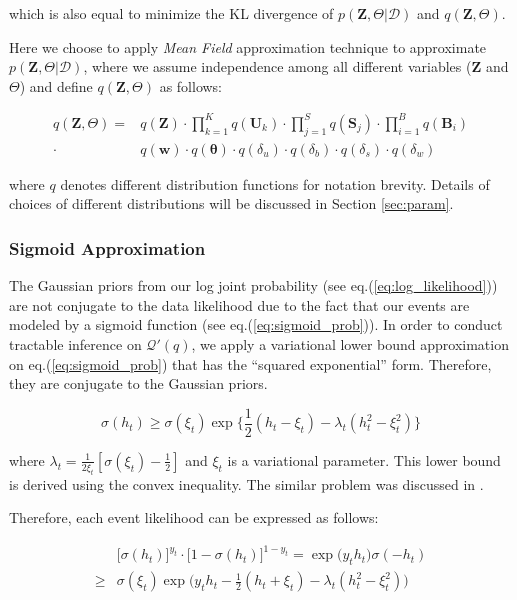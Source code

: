 \noindent which is also equal to minimize the KL divergence of $p(\bm{Z}, \Theta| \mathcal{D})$ and $q(\bm{Z}, \Theta)$.

Here we choose to apply \emph{Mean Field} approximation technique to approximate $p(\bm{Z}, \Theta| \mathcal{D})$, where we assume independence among all different variables ($\mathbf{Z}$ and $\Theta$) and define $q(\bm{Z}, \Theta)$ as follows:

\begin{align}
\label{eq:mean_field}
q(\bm{Z}, \Theta) = & q(\mathbf{Z}) \cdot \prod_{k=1}^K q(\mathbf{U}_k) \cdot \prod_{j=1}^S q(\mathbf{S}_j) \cdot \prod_{i=1}^B q(\mathbf{B}_i) \nonumber \\
\cdot & q(\mathbf{w}) \cdot q(\boldsymbol{\theta}) \cdot q(\delta_u) \cdot q(\delta_b) \cdot q(\delta_s) \cdot q(\delta_w)
\end{align}

\noindent where $q$ denotes different distribution functions for notation brevity. Details of choices of different distributions will be discussed in Section \ref{sec:param}.

\subsubsection{Sigmoid Approximation}

The Gaussian priors from our log joint probability (see eq.(\ref{eq:log_likelihood})) are not conjugate to the data likelihood due to the fact that our events are modeled by a sigmoid function (see eq.(\ref{eq:sigmoid_prob})). In order to conduct tractable inference on $\mathcal{Q}'(q)$, we apply a variational lower bound approximation on eq.(\ref{eq:sigmoid_prob}) that has the ``squared exponential'' form. Therefore, they are conjugate to the Gaussian priors.

\begin{equation*}
\sigma(h_t) \geq \sigma(\xi_t)\exp\big\{\frac{1}{2}(h_t-\xi_t)-\lambda_t(h_t^2-\xi_t^2)\big\}
\end{equation*}

\noindent where $\lambda_t=\frac{1}{2\xi_t}[\sigma(\xi_t)-\frac{1}{2}]$ and $\xi_t$ is a variational parameter. This lower bound is derived using the convex inequality. The similar problem was discussed in \cite{jaakkola1997variational,jordan1999introduction}.

Therefore, each event likelihood can be expressed as follows:

\begin{align}
\label{eq:likelihood_approx}
& \big[\sigma(h_t)\big]^{y_t} \cdot  \big[1-\sigma(h_t) \big]^{1-y_t} = \exp\big( y_t h_t \big) \sigma(-h_t) \nonumber \\
\geq & \sigma(\xi_t)\exp \big(y_t h_t-\frac{1}{2}(h_t+\xi_t)-\lambda_t(h_t^2-\xi_t^2) \big)
\end{align}

